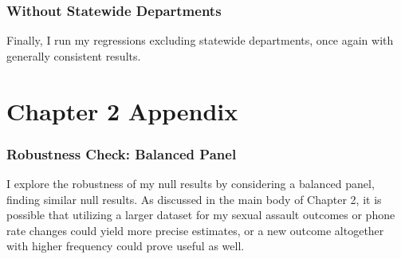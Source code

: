 \clearpage
\subsection{Without Statewide Departments}
Finally, I run my regressions excluding statewide departments, once again with generally consistent results. \\

\begin{table}
	\begin{center}
		
		\caption[Volume Outcome Estimates, Without Statewide Departments]{This table gives volume outcome coefficient estimates for the treatment effect following a shooting event both overall using equation \ref{eq1_DiD} in Panel A and by scrutiny level using equation \ref{eq3_DiDiD} in Panel B.}
		\label{full_DiD_volumes_A08}
	\end{center}
\end{table}

\begin{table}
	\begin{center}
		
		\caption[Rate Outcome Estimates, Without Statewide Departments]{This table gives rate outcome coefficient estimates for the treatment effect following a shooting event both overall using equation \ref{eq1_DiD} in Panel A and by scrutiny level using equation \ref{eq3_DiDiD} in Panel B.}
		\label{full_DiD_rates_A08}
	\end{center}
\end{table}

\chapter{Chapter 2 Appendix}
\graphicspath{{C:/Users/david/coding/01_PRISON_PHONE_paper/6000_LaTeX/}}

\subsection{Robustness Check: Balanced Panel}
I explore the robustness of my null results by considering a balanced panel, finding similar null results. As discussed in the main body of Chapter 2, it is possible that utilizing a larger dataset for my sexual assault outcomes or phone rate changes could yield more precise estimates, or a new outcome altogether with higher frequency could prove useful as well. 

